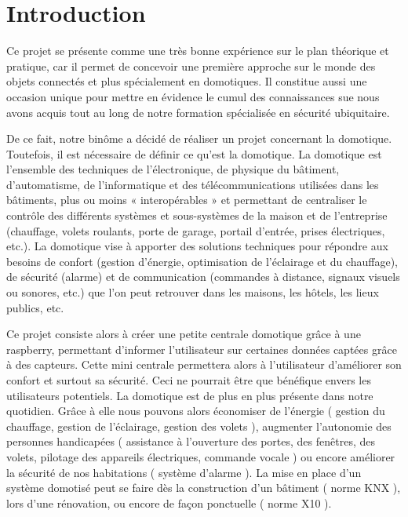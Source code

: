 
\section{Introduction}

Ce projet se présente comme une très bonne expérience sur le plan théorique et pratique, car il permet de concevoir une première approche sur le monde des objets connectés et plus spécialement en domotiques. Il constitue aussi une occasion unique pour mettre en évidence le cumul des connaissances sue nous avons acquis tout au long de notre formation spécialisée en sécurité ubiquitaire.


De ce fait, notre binôme a décidé de réaliser un projet concernant la domotique. Toutefois, il est nécessaire de définir ce qu'est la domotique. La domotique est l'ensemble des techniques de l'électronique, de physique du bâtiment, d'automatisme, de l'informatique et des télécommunications utilisées dans les bâtiments, plus ou moins « interopérables » et permettant de centraliser le contrôle des différents systèmes et sous-systèmes de la maison et de l'entreprise (chauffage, volets roulants, porte de garage, 
portail d'entrée, prises électriques, etc.). La domotique vise à apporter des solutions techniques pour répondre aux besoins de 
confort (gestion d'énergie, optimisation de l'éclairage et du chauffage), de sécurité (alarme) et de communication (commandes à 
distance, signaux visuels ou sonores, etc.) que l'on peut retrouver dans les maisons, les hôtels, les lieux publics, etc.


Ce projet consiste alors à créer une petite centrale domotique grâce à une raspberry, permettant d'informer l'utilisateur sur certaines données captées grâce à des capteurs. Cette mini centrale permettera alors à l'utilisateur d'améliorer son confort et surtout sa sécurité. Ceci ne pourrait être que bénéfique envers les utilisateurs potentiels. La domotique est de plus en plus présente dans notre quotidien. Grâce à elle nous pouvons alors économiser de l'énergie ( gestion du chauffage, gestion de l'éclairage, gestion des volets ), augmenter l'autonomie des personnes handicapées ( assistance à l'ouverture des portes, des fenêtres, des volets, pilotage des appareils électriques, commande vocale ) ou encore améliorer la sécurité de nos habitations ( système d'alarme ). La mise en place d'un système domotisé peut se faire dès la construction d'un bâtiment ( norme KNX ), lors d'une rénovation, ou encore de façon ponctuelle ( norme X10 ).


